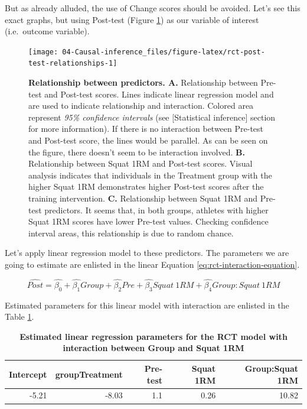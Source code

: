 \documentclass[
]{book}
\begin{document}
But as already alluded, the use of Change scores should be avoided. Let's see this exact graphs, but using Post-test (Figure \ref{fig:rct-post-test-relationships}) as our variable of interest (i.e.~outcome variable).

\begin{figure}

{\centering \texttt{[image: 04-Causal-inference\_files/figure-latex/rct-post-test-relationships-1]} 

}

\caption{\textbf{Relationship between predictors. A. } Relationship between Pre-test and Post-test scores. Lines indicate linear regression model and are used to indicate relationship and interaction. Colored area represent \emph{95\% confidence intervals} (see {[}Statistical inference{]} section for more information). If there is no interaction between Pre-test and Post-test score, the lines would be parallel. As can be seen on the figure, there doesn't seem to be interaction involved. \textbf{B.} Relationship between Squat 1RM and Post-test scores. Visual analysis indicates that individuals in the Treatment group with the higher Squat 1RM demonstrates higher Post-test scores after the training intervention. \textbf{C.} Relationship between Squat 1RM and Pre-test predictors. It seems that, in both groups, athletes with higher Squat 1RM scores have lower Pre-test values. Checking confidence interval areas, this relationship is due to random chance.}\label{fig:rct-post-test-relationships}
\end{figure}



Let's apply linear regression model to these predictors. The parameters we are going to estimate are enlisted in the linear Equation \eqref{eq:rct-interaction-equation}.

\begin{equation}
  \widehat{Post} = \hat{\beta_0} + \hat{\beta_1}Group +  \hat{\beta_2}Pre + \hat{\beta_3}Squat\:1RM + \hat{\beta_4}Group:Squat\:1RM 
  \label{eq:rct-interaction-equation}
\end{equation}

Estimated parameters for this linear model with interaction are enlisted in the Table \ref{tab:rct-interaction-model-coef}.



\begin{table}

\caption{\label{tab:rct-interaction-model-coef}\textbf{Estimated linear regression parameters for the RCT model with interaction between Group and Squat 1RM}}
\centering
\begin{tabular}[t]{rrrrr}
\toprule
Intercept & groupTreatment & Pre-test & Squat 1RM & Group:Squat 1RM\\
\midrule
-5.21 & -8.03 & 1.1 & 0.26 & 10.82\\
\bottomrule
\end{tabular}
\end{table}
\end{document}
